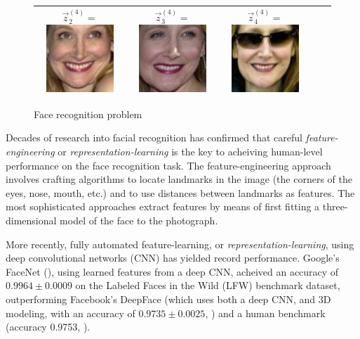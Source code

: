 \begin{figure}
\begin{tabular}{|c|ccc|c|}
  $\vec{z}_2^{(4)} = $\includegraphics[scale = 0.2]{../../proposal/face_photos/Patricia_Clarkson_0002.png} &  
  $\vec{z}_3^{(4)} = $\includegraphics[scale = 0.2]{../../proposal/face_photos/Patricia_Clarkson_0003.png} &  
  $\vec{z}_4^{(4)} = $\includegraphics[scale = 0.2]{../../proposal/face_photos/Patricia_Clarkson_0004.png} \\ \hline
\end{tabular}
\caption{Face recognition problem}
\label{fig:face_rec}
\end{figure}

Decades of research into facial recognition has confirmed that careful
\emph{feature-engineering} or \emph{representation-learning} is the
key to acheiving human-level performance on the face recognition task.
The feature-engineering approach involves crafting algorithms to
locate landmarks in the image (the corners of the eyes, nose, mouth,
etc.) and to use distances between landmarks as features.  The most
sophisticated approaches extract features by means of first fitting a
three-dimensional model of the face to the photograph.

More recently, fully automated feature-learning, or
\emph{representation-learning}, using deep convolutional networks
(CNN) has yielded record performance.  Google's FaceNet
(\cite{schroff2015facenet}), using learned features from a deep CNN,
acheived an accuracy of $0.9964 \pm 0.0009$ on the Labeled Faces in
the Wild (LFW) benchmark dataset, outperforming Facebook's DeepFace
(which uses both a deep CNN, and 3D modeling, with an accuracy of
$0.9735 \pm 0.0025$, \cite{taigman2014deepface}) and a human benchmark
(accuracy 0.9753, \cite{kumar2009attribute}).

